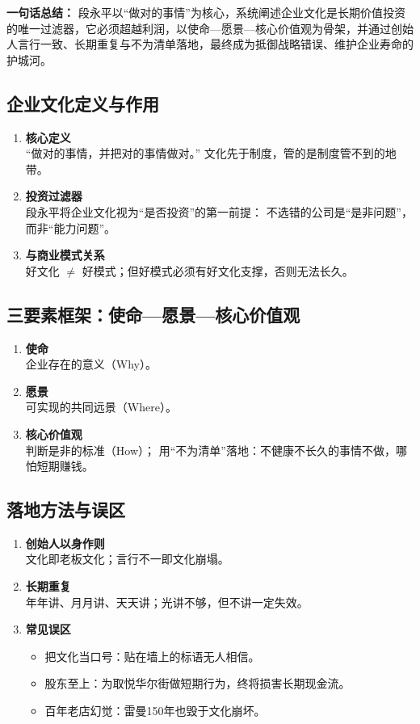 \textbf{一句话总结：}  
段永平以“做对的事情”为核心，系统阐述企业文化是长期价值投资的唯一过滤器，它必须超越利润，以使命—愿景—核心价值观为骨架，并通过创始人言行一致、长期重复与不为清单落地，最终成为抵御战略错误、维护企业寿命的护城河。

\subsection{企业文化定义与作用}
\begin{enumerate}[leftmargin=*, nosep]
    \item \textbf{核心定义}  \\
    “做对的事情，并把对的事情做对。”  
    文化先于制度，管的是制度管不到的地带。
    \item \textbf{投资过滤器}  \\
    段永平将企业文化视为“是否投资”的第一前提：  
    不选错的公司是“是非问题”，而非“能力问题”。
    \item \textbf{与商业模式关系}  \\
    好文化 $\neq$ 好模式；但好模式必须有好文化支撑，否则无法长久。
\end{enumerate}

\subsection{三要素框架：使命—愿景—核心价值观}
\begin{enumerate}[leftmargin=*, nosep]
    \item \textbf{使命}  \\
    企业存在的意义（Why）。
    \item \textbf{愿景}  \\
    可实现的共同远景（Where）。
    \item \textbf{核心价值观}  \\
    判断是非的标准（How）；  
    用“不为清单”落地：不健康不长久的事情不做，哪怕短期赚钱。
\end{enumerate}

\subsection{落地方法与误区}
\begin{enumerate}[leftmargin=*, nosep]
    \item \textbf{创始人以身作则}  \\
    文化即老板文化；言行不一即文化崩塌。
    \item \textbf{长期重复}  \\
    年年讲、月月讲、天天讲；光讲不够，但不讲一定失效。
    \item \textbf{常见误区}  
    \begin{itemize}[nosep]
        \item 把文化当口号：贴在墙上的标语无人相信。  
        \item 股东至上：为取悦华尔街做短期行为，终将损害长期现金流。  
        \item 百年老店幻觉：雷曼150年也毁于文化崩坏。
    \end{itemize}
\end{enumerate}

